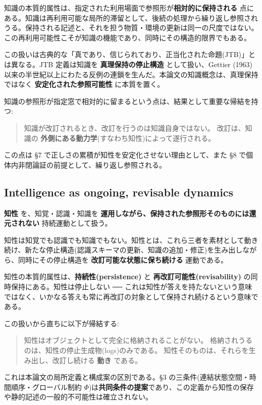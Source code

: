 知識の本質的属性は、指定された利用場面で参照形が\textbf{相対的に保持される} 点にある。知識は再利用可能な局所的滞留として、後続の処理から繰り返し参照されうる。保持される記述と、それを担う物質・環境の更新は同一の尺度ではない。この再利用可能性こそが知識の機能であり、同時にその構造的限界でもある。

この扱いは古典的な「真であり、信じられており、正当化された命題(JTB)」とは異なる。JTB 定義は知識を \textbf{真理保持の停止構造} として扱い、Gettier (1963) 以来の半世紀以上にわたる反例の連鎖を生んだ。本論文の知識概念は、真理保持ではなく \textbf{安定化された参照可能性} に本質を置く。

知識の参照形が指定窓で相対的に留まるという点は、結果として重要な帰結を持つ:

\begin{quote}
知識が改訂されるとき、改訂を行うのは知識自身ではない。
改訂は、知識の \textbf{外側にある動力学}(すなわち知性)によって遂行される。
\end{quote}

この点は \S{}7 で正しさの累積が知性を安定化させない理由として、また \S{}8 で個体内非閉論証の前提として、繰り返し参照される。

\subsection{Intelligence as ongoing, revisable dynamics}


\textbf{知性} を、知覚・認識・知識を \textbf{運用しながら、保持された参照形そのものには還元されない} 持続運動として扱う。

知性は知覚でも認識でも知識でもない。知性とは、これら三者を素材として動き続け、新たな停止構造(認識スキーマの更新、知識の追加・修正)を生み出しながら、同時にその停止構造を \textbf{改訂可能な状態に保ち続ける} 運動である。

知性の本質的属性は、\textbf{持続性(persistence)} と \textbf{再改訂可能性(revisability)} の同時保持にある。知性は停止しない ── これは知性が答えを持たないという意味ではなく、いかなる答えも常に再改訂の対象として保持され続けるという意味である。

この扱いから直ちに以下が帰結する:

\begin{quote}
知性はオブジェクトとして完全に格納されることがない。
格納されうるのは、知性の停止生成物(logs)のみである。
知性そのものは、それらを生み出し、改訂し続ける \textbf{動き} である。
\end{quote}

これは本論文の局所定義と構成案の区別である。\S{}3 の三条件(連結状態空間・時間順序・グローバル制約 $\Phi$)は\textbf{共同条件の提案}であり、この定義から知性の保存や静的記述の一般的不可能性は確立されない。

